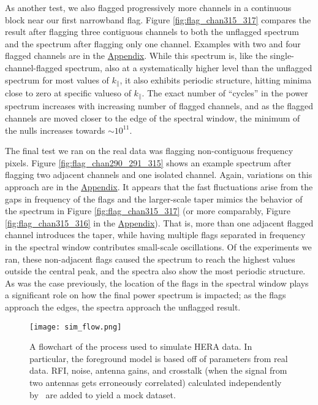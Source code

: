 \documentclass[12pt]{article}
\begin{document}
As another test, we also flagged progressively more channels in a continuous block near our first narrowband flag. Figure \ref{fig:flag_chan315_317} compares the result after flagging three contiguous channels to both the unflagged spectrum and the spectrum after flagging only one channel. Examples with two and four flagged channels are in the \hyperlink{appendix}{Appendix}. While this spectrum is, like the single-channel-flagged spectrum, also at a systematically higher level than the unflagged spectrum for most values of $k_\parallel$, it also exhibits periodic structure, hitting minima close to zero at specific valueso of $k_\parallel$. The exact number of ``cycles'' in the power spectrum increases with increasing number of flagged channels, and as the flagged channels are moved closer to the edge of the spectral window, the minimum of the nulls increases towards $\sim 10^{11}$.

The final test we ran on the real data was flagging non-contiguous frequency pixels. Figure \ref{fig:flag_chan290_291_315} shows an example spectrum after flagging two adjacent channels and one isolated channel. Again, variations on this approach are in the \hyperlink{appendix}{Appendix}. It appears that the fast fluctuations arise from the gaps in frequency of the flags and the larger-scale taper mimics the behavior of the spectrum in Figure \ref{fig:flag_chan315_317} (or more comparably, Figure \ref{fig:flag_chan315_316} in the \hyperlink{appendix}{Appendix}). That is, more than one adjacent flagged channel introduces the taper, while having multiple flags separated in frequency in the spectral window contributes small-scale oscillations. Of the experiments we ran, these non-adjacent flags caused the spectrum to reach the highest values outside the central peak, and the spectra also show the most periodic structure. As was the case previously, the location of the flags in the spectral window plays a significant role on how the final power spectrum is impacted; as the flags approach the edges, the spectra approach the unflagged result. \vspace{3mm}

\begin{figure}[t]
	\centering
	\texttt{[image: sim\_flow.png]}
	\caption[Flowchart of the process of modelling HERA data]{A flowchart of the process used to simulate HERA data. In particular, the foreground model is based off of parameters from real data. RFI, noise, antenna gains, and crosstalk (when the signal from two antennas gets erroneously correlated) calculated independently by \herasim~are added to yield a mock dataset.}
	\label{fig:sim_flow}
\end{figure}
\end{document}
